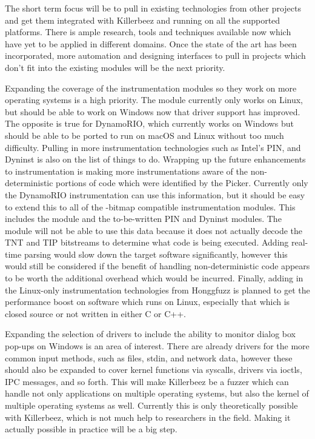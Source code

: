 The short term focus will be to pull in existing technologies from other
projects and get them integrated with Killerbeez and running on all the
supported platforms.  There is ample research, tools and techniques available
now which have yet to be applied in different domains. Once the state of the
art has been incorporated, more automation and designing interfaces to pull in
projects which don't fit into the existing modules will be the next priority.

Expanding the coverage of the instrumentation modules so they work on more
operating systems is a high priority. The \IPT{} module currently only works
on Linux, but should be able to work on Windows now that driver support has
improved. The opposite is true for DynamoRIO, which currently works on Windows
but should be able to be ported to run on macOS and Linux without too much
difficulty.  Pulling in more instrumentation technologies such as Intel's PIN,
and Dyninst\cite{dyninst} is also on the list of things to do. Wrapping up the
future enhancements to instrumentation is making more instrumentations aware of
the non-deterministic portions of code which were identified by the Picker.
Currently only the DynamoRIO instrumentation can use this information, but
it should be easy to extend this to all of the \AFL{}-bitmap compatible
instrumentation modules.  This includes the \AFL{} module and the to-be-written
PIN and Dyninst modules.  The \IPT{} module will not be able to use this data
because it does not actually decode the TNT and TIP bitstreams to determine what
code is being executed. Adding real-time parsing would slow down the target
software significantly, however this would still be considered if the benefit
of handling non-deterministic code appears to be worth the additional overhead
which would be incurred. Finally, adding in the Linux-only instrumentation
technologies from Honggfuzz\cite{honggfuzz} is planned to get the performance
boost on software which runs on Linux, especially that which is closed source
or not written in either C or C++.

Expanding the selection of drivers to include the ability to monitor dialog
box pop-ups on Windows is an area of interest. There are already drivers for
the more common input methods, such as files, stdin, and network data, however
these should also be expanded to cover kernel functions via syscalls, drivers
via ioctls, IPC messages, and so forth. This will make Killerbeez be a fuzzer
which can handle not only applications on multiple operating systems, but also
the kernel of multiple operating systems as well.  Currently this is only
theoretically possible with Killerbeez, which is not much help to researchers
in the field. Making it actually possible in practice will be a big step.

